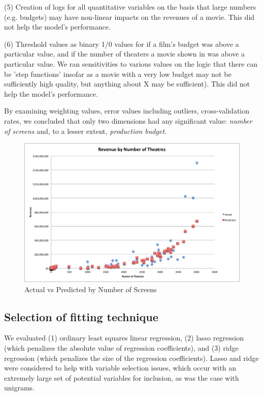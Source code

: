 \documentclass[11pt, oneside]{article}   	%
\begin{document}
(5) Creation of logs for all quantitative variables on the basis that large numbers (e.g. budgets) may have non-linear impacts on the revenues of a movie. This did not help the model's performance.

(6) Threshold values as binary 1/0 values for if a film's budget was above a particular value, and if the number of theaters a movie shown in was above a particular value. We ran sensitivities to various values on the logic that there can be 'step functions' insofar as a movie with a very low budget may not be sufficiently high quality, but anything about X may be sufficient). This did not help the model's performance.

By examining weighting values, error values including outliers, cross-validation rates, we concluded that only two dimensions had any significant value: \emph{number of screens} and, to a lesser extent, \emph{production budget}.


\begin{figure}[h!] 
\centering
\includegraphics[scale=0.55]{numberOfTheatres}
\caption{Actual vs Predicted by Number of Screens}
\end{figure}


\subsection*{Selection of fitting technique}

We evaluated (1) ordinary least squares linear regression, (2) lasso regression (which penalizes the absolute value of regression coefficients), and (3) ridge regression (which penalizes the size of the regression coefficients). Lasso and ridge were considered to help with variable selection issues, which occur with an extremely large set of potential variables for inclusion, as was the case with unigrams.
\end{document}
